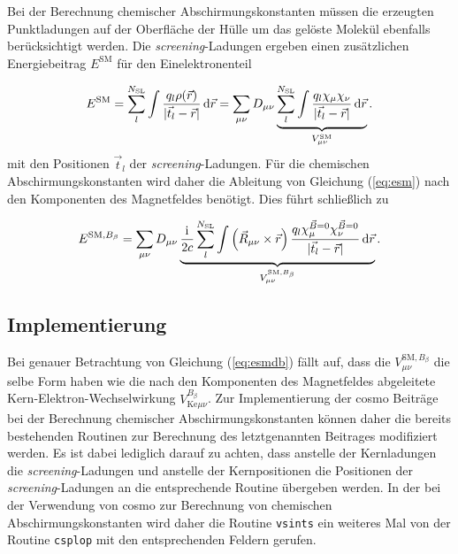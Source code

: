 Bei der Berechnung chemischer Abschirmungskonstanten müssen die erzeugten Punktladungen auf der Oberfläche der Hülle um das gelöste Molekül ebenfalls berücksichtigt werden. Die \textit{screening}-Ladungen ergeben einen zusätzlichen Energiebeitrag $E^{\textrm{SM}}$ für den Einelektronenteil\supercite{cammi1999nuclear}

	\begin{equation}\label{eq:esm}
	E^{\textrm{SM}}=\sum_{l}^{N_{\textrm{SL}}}\int\frac{q_l\rho(\vec{r})}{\vert\vec{t}_l-\vec{r}\vert}\mathop{}\!\mathrm{d}\vec{r}=\sum_{\mu\nu}D_{\mu\nu}\underbrace{\sum_l^{N_{\textrm{SL}}}\int\frac{q_l\chi_\mu\chi_\nu}{\vert\vec{t}_l-\vec{r}\vert}\mathop{}\!\mathrm{d}\vec{r}}_{V_{\mu\nu}^{\textrm{SM}}}.
	\end{equation}
mit den Positionen $\vec{t}_l$ der \textit{screening}-Ladungen. Für die chemischen Abschirmungskonstanten wird daher die Ableitung von Gleichung (\ref{eq:esm}) nach den Komponenten des Magnetfeldes benötigt. Dies führt schließlich zu

	\begin{equation}\label{eq:esmdb}
	E^{\textrm{SM},B_\beta}=\sum_{\mu\nu}D_{\mu\nu}\underbrace{\frac{\mathrm{i}\mkern1mu}{2c}\sum_l^{N_{\textrm{SL}}}\int\left(\vec{R}_{\mu\nu}\times\vec{r}\right)\frac{q_l\chi_\mu^{\vec{B}=0}\chi_\nu^{\vec{B}=0}}{\vert\vec{t}_l-\vec{r}\vert}\mathop{}\!\mathrm{d}\vec{r}}_{V_{\mu\nu}^{\textrm{SM},B_\beta}}.
	\end{equation}
	
	\subsection{Implementierung}
	Bei genauer Betrachtung von Gleichung (\ref{eq:esmdb}) fällt auf, dass die $V_{\mu\nu}^{\textrm{SM},B_\beta}$ die selbe Form haben wie die nach den Komponenten des Magnetfeldes abgeleitete Kern-Elektron-Wechselwirkung $V_{\textrm{Ke}\mu\nu}^{B_\beta}$. Zur Implementierung der \ac{cosmo} Beiträge bei der Berechnung chemischer Abschirmungskonstanten können daher die bereits bestehenden Routinen zur Berechnung des letztgenannten Beitrages modifiziert werden. Es ist dabei lediglich darauf zu achten, dass anstelle der Kernladungen die \textit{screening}-Ladungen und anstelle der Kernpositionen die Positionen der \textit{screening}-Ladungen an die entsprechende Routine übergeben werden. In der bei der Verwendung von \ac{cosmo} zur Berechnung von chemischen Abschirmungskonstanten wird daher die Routine \texttt{vsints} ein weiteres Mal von der Routine \texttt{csplop} mit den entsprechenden Feldern gerufen. 
	
